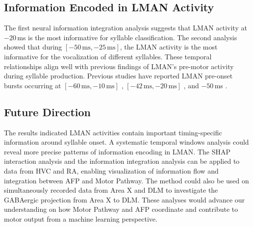\documentclass[../CLthesis.tex]{subfiles}
\begin{document}
\subsection{Information Encoded in LMAN Activity}
The first neural information integration analysis suggests that LMAN activity at $-20$\,ms is the most informative for syllable classification. The second analysis showed that during $[-50\,\text{ms}, -25\,\text{ms}]$, the LMAN activity is the most informative for the vocalization of different syllables. These temporal relationships align well with previous findings of LMAN's pre-motor activity during syllable production. Previous studies have reported LMAN pre-onset bursts occurring at $[-60\,\text{ms}, -10\,\text{ms}]$ \citep{Kojima2018-rw}, $[-42\,\text{ms}, -20\,\text{ms}]$ \citep{Giret2014-kx}, and $-50$\,ms \citep{Kao2005-cl}.

\subsection{Future Direction}
The results indicated LMAN activities contain important timing-specific information around syllable onset. A systematic temporal windows analysis could reveal more precise patterns of information encoding in LMAN. The SHAP interaction analysis and the information integration analysis can be applied to data from HVC and RA, enabling visualization of information flow and integration between AFP and Motor Pathway. The method could also be used on simultaneously recorded data from Area X and DLM to investigate the GABAergic projection from Area X to DLM. These analyses would advance our understanding on how Motor Pathway and AFP coordinate and contribute to motor output from a machine learning perspective.
\subfilebibliography
\end{document}
